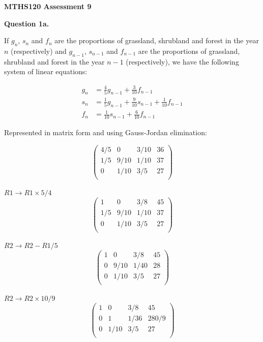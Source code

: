 \documentclass[12pt,a4paper]{report}
\begin{document}
\textbf{MTHS120 Assessment 9}

\textbf{Question 1a.}

If \(g_n\), \(s_n\) and \(f_n\) are the proportions of grassland, shrubland and forest in the year \(n\) (respectively) and \(g_{n-1}\), \(s_{n-1}\) and \(f_{n-1}\) are the proportions of grassland, shrubland and forest in the year \(n-1\) (respectively), we have the following system of linear equations:

\begin{align*}
g_n &= \frac{4}{5}g_{n-1} + \frac{3}{10}f_{n-1} \\
s_n &= \frac{1}{5}g_{n-1} + \frac{9}{10}s_{n-1} + \frac{1}{10}f_{n-1} \\
f_n &= \frac{1}{10}s_{n-1} + \frac{6}{10}f_{n-1}
\end{align*} 

Represented in matrix form and using Gauss-Jordan elimination:

 \[
 \left(\begin{array}{rrr|r}
 4/5 & 0 & 3/10 & 36  \\
 1/5 & 9/10 & 1/10 & 37   \\
 0 & 1/10 & 3/5 & 27   \\
   \end{array} \right)
\] \\
 
\(R1 \rightarrow R1 \times 5/4 \)
  \[
 \left(\begin{array}{rrr|r}
 1 & 0 & 3/8 & 45   \\
 1/5 & 9/10 & 1/10 & 37   \\
 0 & 1/10 & 3/5 & 27   \\
   \end{array} \right)
\] \\
 
\(R2 \rightarrow R2 - R1 / 5 \)
  \[
 \left(\begin{array}{rrr|r}
 1 & 0 & 3/8 & 45   \\
 0 & 9/10 & 1/40 & 28   \\
 0 & 1/10 & 3/5 & 27   \\
   \end{array} \right)
\] \\
 
\(R2 \rightarrow R2 \times 10/9 \)
  \[
 \left(\begin{array}{rrr|r}
 1 & 0 & 3/8 & 45   \\
 0 & 1 & 1/36 & 280/9  \\
 0 & 1/10 & 3/5 & 27   \\
   \end{array} \right)
\] \\
 
\end{document}
